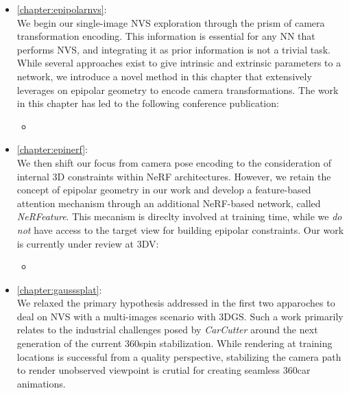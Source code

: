 \begin{itemize}
      \item \autoref{chapter:epipolarnvs}: \\
            We begin our single-image \ac{NVS} exploration through the prism of camera transformation encoding. This information is essential for any \ac{NN} that performs \ac{NVS}, and integrating it as prior information is not a trivial task. While several approaches exist to give intrinsic and extrinsic parameters to a network, we introduce a novel method in this chapter that extensively leverages on epipolar geometry to encode camera transformations. The work in this chapter has led to the following conference publication:
            \begin{itemize}
                \item {}
            \end{itemize}

      \item \autoref{chapter:epinerf}: \\
            We then shift our focus from camera pose encoding to the consideration of internal 3D constraints within \ac{NeRF} architectures. However, we retain the concept of epipolar geometry in our work and develop a feature-based attention mechanism through an additional \ac{NeRF}-based network, called \textit{NeRFeature}. This mecanism is direclty involved at training time, while we \textit{do not} have access to the target view for building epipolar constraints. Our work is currently under review at 3DV:
            \begin{itemize}
                  \item {}
            \end{itemize}

      \item \autoref{chapter:gausssplat}: \\
            We relaxed the primary hypothesis addressed in the first two apparoches to deal on \ac{NVS} with a multi-images scenario with 3D\ac{GS}. Such a work primarily relates to the industrial challenges posed by \textit{CarCutter} around the next generation of the current 360\degree spin stabilization. While rendering at training locations is successful from a quality perspective, stabilizing the camera path to render unobserved viewpoint is crutial for creating seamless 360\degree car animations. 


\end{itemize}
